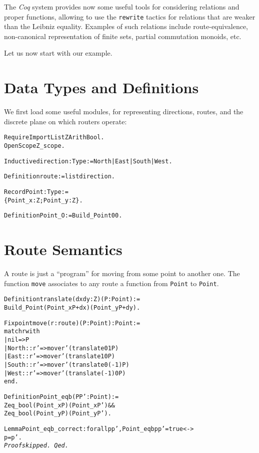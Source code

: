 \documentclass[a4]{report}
\newcommand{\coq}{\mbox{\emph{Coq}}}
\begin{document}
The {\coq} system provides now some useful tools for considering relations
and proper functions, allowing to use the \texttt{rewrite} tactics for 
relations that are weaker than the Leibniz equality. Examples of such relations
include route-equivalence, non-canonical representation of finite sets, 
partial commutation monoids, etc.

Let us now start with our example.

\section{Data Types and Definitions}

We first load some useful modules, for representing directions, routes, and 
the discrete plane on which routers operate:


\begin{alltt}
Require Import List ZArith Bool.
Open Scope Z_scope.

Inductive direction : Type := North | East | South | West.

Definition route := list direction.

Record Point : Type :=
  \{Point_x : Z; Point_y : Z\}.

Definition Point_O := Build_Point 0 0.
\end{alltt}

\section{Route Semantics}
A route is just a ``program'' for moving from some point to another one.
The function \texttt{move} associates to any route a function from \texttt{Point} to \texttt{Point}.

\begin{alltt}
Definition translate (dx dy:Z) (P : Point) :=
  Build_Point (Point_x P + dx) (Point_y P + dy).

Fixpoint move (r:route) (P:Point) : Point :=
 match r with
 | nil => P
 | North :: r' => move r' (translate 0 1 P)
 | East :: r' => move r' (translate 1 0 P) 
 | South :: r' => move r' (translate 0 (-1) P)
 | West :: r' => move r' (translate (-1) 0 P)
 end.

Definition Point_eqb (P P':Point) :=
   Zeq_bool (Point_x P) (Point_x P') \&\&
   Zeq_bool (Point_y P) (Point_y P').

Lemma Point_eqb_correct : forall p p', Point_eqb p p' = true <->
                                       p = p'.
\it Proof skipped.\tt
Qed.
\end{alltt}
\end{document}
